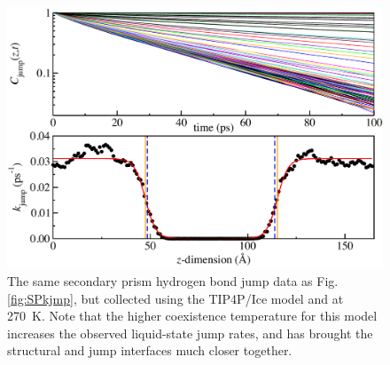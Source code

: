 \begin{figure}
\includegraphics[width=\linewidth]{Figures/secprismJumpPlotTIP4PIce}
\caption{\label{fig:SPTIP4Pkjmp} The same secondary prism hydrogen
  bond jump data as Fig. \ref{fig:SPkjmp}, but collected using the
  TIP4P/Ice model and at 270~K.  Note that the higher coexistence
  temperature for this model increases the observed liquid-state jump
  rates, and has brought the structural and jump interfaces much
  closer together.}
\end{figure}
